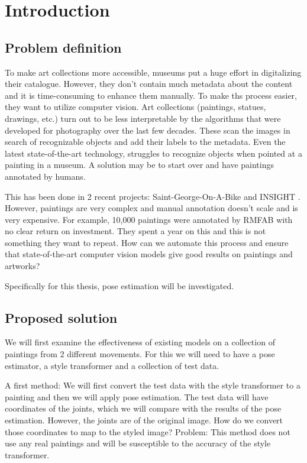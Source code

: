 \chapter{Introduction}
\label{chap:intro}

\section{Problem definition}

To make art collections more accessible, museums put a huge effort in digitalizing their catalogue.
However, they don't contain much metadata about the content and it is time-consuming to enhance them manually.
To make ths process easier, they want to utilize computer vision.
Art collections (paintings, statues, drawings, etc.) turn out to be less interpretable by the algorithms that were developed for photography over the last few decades. 
These scan the images in search of recognizable objects and add their labels to the metadata.
Even the latest state-of-the-art technology, struggles to recognize objects when pointed at a painting in a museum.  
A solution may be to start over and have paintings annotated by humans.  
  
This has been done in 2 recent projects:  Saint-George-On-A-Bike \cite{GeorgeOnABike} and INSIGHT \cite{Insight}.
However, paintings are very complex and manual annotation doesn't scale and is very expensive.
For example, 10,000 paintings were annotated by \gls{RMFAB} with no clear return on investment.
They spent a year on this and this is not something they want to repeat.
How can we automate this process and ensure that state-of-the-art computer vision models give good results on paintings and artworks?  
  
Specifically for this thesis, pose estimation will be investigated.

\section{Proposed solution}
We will first examine the effectiveness of existing models on a collection of paintings from 2 different movements.
For this we will need to have a pose estimator, a style transformer and a collection of test data. 

A first method: We will first convert the test data with the style transformer to a painting and then we will apply pose estimation.
The test data will have coordinates of the joints, which we will compare with the results of the pose estimation.
However, the joints are of the original image. How do we convert those coordinates to map to the styled image? 
Problem: This method does not use any real paintings and will be susceptible to the accuracy of the style transformer.  

